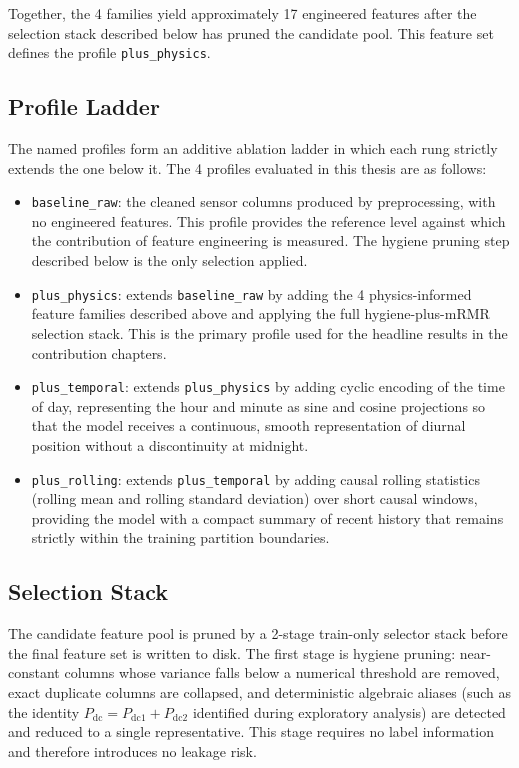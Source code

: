 Together, the 4 families yield approximately 17 engineered features after the selection stack described below has pruned the candidate pool. This feature set defines the profile \texttt{plus\_physics}.

\subsection{Profile Ladder}

The named profiles form an additive ablation ladder in which each rung strictly extends the one below it. The 4 profiles evaluated in this thesis are as follows:

\begin{itemize}
    \item \texttt{baseline\_raw}: the cleaned sensor columns produced by preprocessing, with no engineered features. This profile provides the reference level against which the contribution of feature engineering is measured. The hygiene pruning step described below is the only selection applied.
    \item \texttt{plus\_physics}: extends \texttt{baseline\_raw} by adding the 4 physics-informed feature families described above and applying the full hygiene-plus-mRMR selection stack. This is the primary profile used for the headline results in the contribution chapters.
    \item \texttt{plus\_temporal}: extends \texttt{plus\_physics} by adding cyclic encoding of the time of day, representing the hour and minute as sine and cosine projections so that the model receives a continuous, smooth representation of diurnal position without a discontinuity at midnight.
    \item \texttt{plus\_rolling}: extends \texttt{plus\_temporal} by adding causal rolling statistics (rolling mean and rolling standard deviation) over short causal windows, providing the model with a compact summary of recent history that remains strictly within the training partition boundaries.
\end{itemize}

\subsection{Selection Stack}

The candidate feature pool is pruned by a 2-stage train-only selector stack before the final feature set is written to disk. The first stage is hygiene pruning: near-constant columns whose variance falls below a numerical threshold are removed, exact duplicate columns are collapsed, and deterministic algebraic aliases (such as the identity $P_{\mathrm{dc}} = P_{\mathrm{dc}1} + P_{\mathrm{dc}2}$ identified during exploratory analysis) are detected and reduced to a single representative. This stage requires no label information and therefore introduces no leakage risk.

